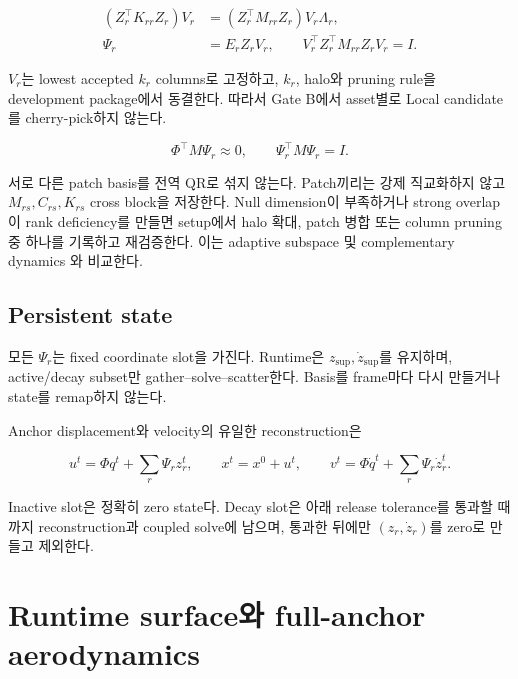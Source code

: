 \documentclass[11pt]{article}
\begin{document}
\begin{equation}
\begin{aligned}
  (Z_r^\top K_{rr}Z_r)V_r
  &=
  (Z_r^\top M_{rr}Z_r)V_r\Lambda_r,\\
  \Psi_r&=E_rZ_rV_r,\qquad
  V_r^\top Z_r^\top M_{rr}Z_rV_r=I.
\end{aligned}
  \label{eq:minimal-local-complement}
\end{equation}

\(V_r\)는 lowest accepted \(k_r\) columns로 고정하고, \(k_r\), halo와 pruning rule을
development package에서 동결한다. 따라서 Gate B에서 asset별로 Local candidate를 cherry-pick하지 않는다.

\begin{equation}
  \Phi^\top M\Psi_r\approx0,\qquad
  \Psi_r^\top M\Psi_r=I.
  \label{eq:minimal-complement-check}
\end{equation}

서로 다른 patch basis를 전역 QR로 섞지 않는다.
Patch끼리는 강제 직교화하지 않고 \(M_{rs},C_{rs},K_{rs}\) cross block을 저장한다.
Null dimension이 부족하거나 strong overlap이 rank deficiency를 만들면
setup에서 halo 확대, patch 병합 또는 column pruning 중 하나를 기록하고 재검증한다.
이는 adaptive subspace 및 complementary dynamics
\cite{benchekroun2023complementary,xiang2026freeform}와 비교한다.

\subsection{Persistent state}

모든 \(\Psi_r\)는 fixed coordinate slot을 가진다.
Runtime은 \(z_{\mathrm{sup}},\dot z_{\mathrm{sup}}\)를 유지하며,
active/decay subset만 gather--solve--scatter한다.
Basis를 frame마다 다시 만들거나 state를 remap하지 않는다.

Anchor displacement와 velocity의 유일한 reconstruction은

\begin{equation}
  u^t=\Phi q^t+\sum_r\Psi_rz_r^t,\qquad
  x^t=x^0+u^t,\qquad
  v^t=\Phi\dot q^t+\sum_r\Psi_r\dot z_r^t.
  \label{eq:minimal-state-reconstruction}
\end{equation}

Inactive slot은 정확히 zero state다. Decay slot은 아래 release tolerance를 통과할 때까지
reconstruction과 coupled solve에 남으며, 통과한 뒤에만 \((z_r,\dot z_r)\)를 zero로 만들고 제외한다.

\section{Runtime surface와 full-anchor aerodynamics}
\end{document}

